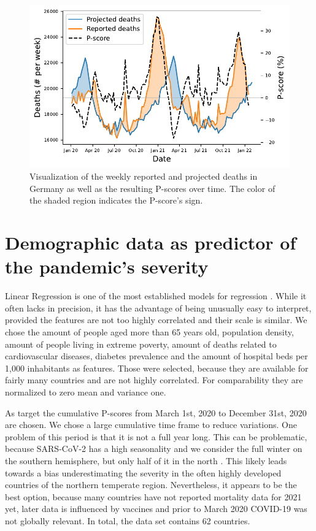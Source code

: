 \documentclass{article}
\begin{document}
\begin{figure}[t]
	\centering
	\includegraphics[width=0.7\linewidth]{fig/fig_em_intro}
	\caption[P-scores Germany]{Visualization of the weekly reported and projected deaths in Germany as well as the resulting P-scores over time. The color of the shaded region indicates the P-score's sign. \label{fig:em_germany}}
\end{figure}

\section{Demographic data as predictor of the pandemic's severity}

Linear Regression is one of the most established models for regression \citep{galton86}. While it often lacks in precision, it has the advantage of being unusually easy to interpret, provided the features are not too highly correlated and their scale is similar. We chose the amount of people aged more than 65 years old, population density, amount of people living in extreme poverty, amount of deaths related to cardiovascular diseases, diabetes prevalence and the amount of hospital beds per 1,000 inhabitants as features. Those were selected, because they are available for fairly many countries and are not highly correlated. For comparability they are normalized to zero mean and variance one. 

As target the cumulative P-scores from March 1st, 2020 to December 31st, 2020 are chosen. We chose a large cumulative time frame to reduce variations. One problem of this period is that it is not a full year long. This can be problematic, because SARS-CoV-2 has a high seasonality and we consider the full winter on the southern hemisphere, but only half of it in the north \citep{gavenciak21}. This likely leads towards a bias underestimating the severity in the often highly developed countries of the northern temperate region. Nevertheless, it appears to be the best option, because many countries have not reported mortality data for 2021 yet, later data is influenced by vaccines and prior to March 2020 COVID-19 was not globally relevant. In total, the data set contains 62 countries.
\end{document}
